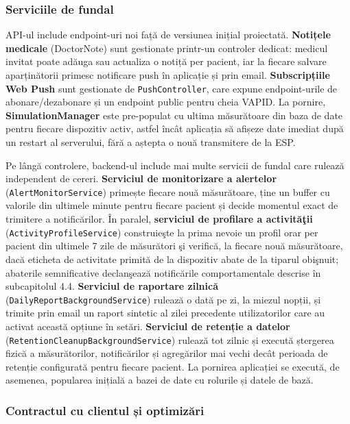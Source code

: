 \documentclass[12pt,a4paper,twoside]{article}
\begin{document}
\subsubsection{Serviciile de fundal}

API-ul include endpoint-uri noi față de versiunea inițial proiectată. \textbf{Notițele medicale} (DoctorNote) sunt gestionate printr-un controler dedicat: medicul invitat poate adăuga sau actualiza o notiță per pacient, iar la fiecare salvare aparținătorii primesc notificare push în aplicație și prin email. \textbf{Subscripțiile Web Push} sunt gestionate de \texttt{PushController}, care expune endpoint-urile de abonare/dezabonare și un endpoint public pentru cheia VAPID. La pornire, \textbf{SimulationManager} este pre-populat cu ultima măsurătoare din baza de date pentru fiecare dispozitiv activ, astfel încât aplicația să afișeze date imediat după un restart al serverului, fără a aștepta o nouă transmitere de la ESP.

Pe lângă controlere, backend-ul include mai multe servicii de fundal care rulează independent de cereri. \textbf{Serviciul de monitorizare a alertelor} (\texttt{AlertMonitorService}) primește fiecare nouă măsurătoare, ține un buffer cu valorile din ultimele minute pentru fiecare pacient și decide momentul exact de trimitere a notificărilor. În paralel, \textbf{serviciul de profilare a activităţii} (\texttt{ActivityProfileService}) construieşte la prima nevoie un profil orar per pacient din ultimele 7 zile de măsurători şi verifică, la fiecare nouă măsurătoare, dacă eticheta de activitate primită de la dispozitiv abate de la tiparul obişnuit; abaterile semnificative declanşează notificările comportamentale descrise în subcapitolul 4.4. \textbf{Serviciul de raportare zilnică} (\texttt{Daily\-Report\-Background\-Service}) rulează o dată pe zi, la miezul nopții, și trimite prin email un raport sintetic al zilei precedente utilizatorilor care au activat această opțiune în setări. \textbf{Serviciul de retenție a datelor} (\texttt{RetentionCleanupBackgroundService}) rulează tot zilnic și execută ștergerea fizică a măsurătorilor, notificărilor și agregărilor mai vechi decât perioada de retenție configurată pentru fiecare pacient. La pornirea aplicației se execută, de asemenea, popularea inițială a bazei de date cu rolurile și datele de bază.

\subsubsection{Contractul cu clientul și optimizări}
\end{document}
